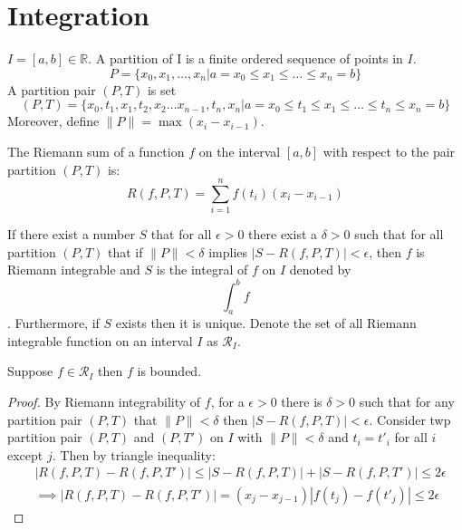 \chapter{Integration}
\thispagestyle{headings}

\begin{definition}[Partition]
    \(I = [a,b] \in \mathbb{R}\). A partition of I is a finite ordered sequence of points in \(I\).
    \begin{equation*}
        P = \{x_0, x_1, \dots, x_n | a = x_0 \leq x_1 \leq \dots \leq x_n = b\}
    \end{equation*}
    A partition pair \((P,T)\) is set
    \begin{equation*}
        (P,T) = \{x_0, t_1,x_1, t_2,x_2 \dots x_{n-1}, t_n, x_n | a = x_0 \leq t_1 \leq x_1 \leq \dots \leq t_n \leq x_n = b\}
    \end{equation*}
    Moreover, define \(\|P\| = \max{(x_i - x_{i-1})}\).
\end{definition}
The Riemann sum of a function \(f\) on the interval \([a,b]\) with respect to the pair partition \((P,T)\) is:
\begin{equation*}
    R(f,P,T)= \sum_{i = 1}^{n} {f(t_i)(x_i - x_{i-1})}
\end{equation*}
\begin{definition}
    If there exist a number \(S\) that for all \(\epsilon > 0\) there exist a \(\delta > 0\) such that for all partition \((P,T)\) that if \(\|P\| < \delta\) implies \(|S - R(f,P,T)| < \epsilon\), then \(f\) is Riemann integrable and \(S\) is the integral of \(f\) on \(I\) denoted by
    \begin{equation*}
        \int_{a}^{b}{f}
    \end{equation*}
    . Furthermore, if \(S\) exists then it is unique.
    Denote the set of all Riemann integrable function on an interval \(I\) as \(\mathcal{R}_I\).
\end{definition}
\begin{theorem}
    Suppose \(f \in \mathcal{R}_I\) then \(f\) is bounded.
\end{theorem}
\begin{proof}
    By Riemann integrability of \(f\), for a \(\epsilon > 0\) there is \(\delta > 0\) such that for any partition pair \((P,T)\) that \(\|P\| < \delta\) then \(|S - R(f,P,T)| < \epsilon\). Consider twp partition pair \((P,T)\) and \((P,T')\) on \(I\) with  \(\|P\| < \delta\) and \(t_i = t'_i\) for all \(i\) except \(j\). Then by triangle inequality:
    \begin{align*}
         & |R(f,P,T) - R(f,P,T')| \leq |S - R(f,P,T)| + |S - R(f,P,T')| \leq 2 \epsilon       \\
         & \implies |R(f,P,T) - R(f,P,T')| = (x_j - x_{j-1})|f(t_j) - f(t'_j)| \leq 2\epsilon
    \end{align*}
\end{proof}
